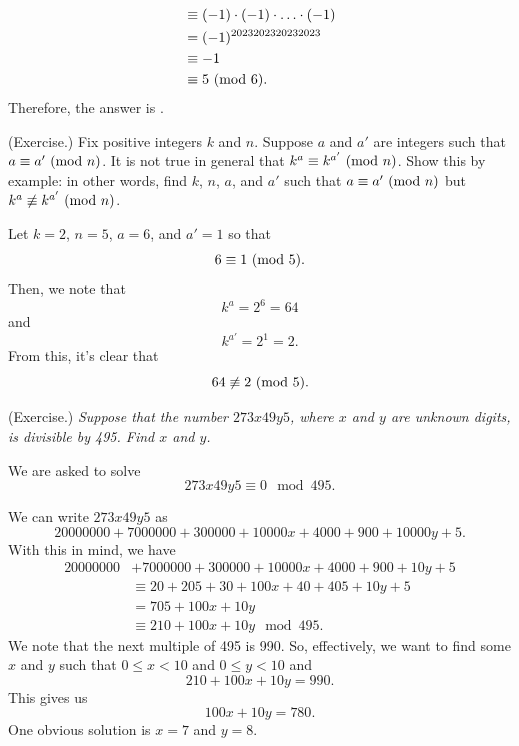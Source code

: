 \documentclass[letterpaper]{article}
\newcommand{\0}{\mathbf{0}}
\begin{document}
\begin{mdframed}
\begin{itemize}
\begin{mdframed}
\begin{equation*}
\begin{aligned}
                        &\equiv (-1) \cdot (-1) \cdot \hdots \cdot (-1) \\ 
                        &= (-1)^{2023202320232023} \\ 
                        &\equiv -1 \\ 
                        &\equiv 5 \ (\mathrm{mod}\ 6).
                \end{aligned}
            \end{equation*}
            Therefore, the answer is .
        \end{mdframed}
    \end{itemize}
\end{mdframed}

\begin{mdframed}
    (Exercise.) Fix positive integers $k$ and $n$. Suppose $a$ and $a'$ are integers such that $a \equiv a' \ (\mathrm{mod}\ n)$. It is not true in general that $k^a \equiv k^{a'} \ (\mathrm{mod}\ n)$. Show this by example: in other words, find $k$, $n$, $a$, and $a'$ such that $a \equiv a' \ (\mathrm{mod}\ n)$ but $k^a \not\equiv k^{a'} \ (\mathrm{mod}\ n)$. 

    \begin{mdframed}
        Let $k = 2$, $n = 5$, $a = 6$, and $a' = 1$ so that 
        \[6 \equiv 1 \ (\mathrm{mod}\ 5).\]
        Then, we note that 
        \[k^a = 2^6 = 64\]
        and 
        \[k^{a'} = 2^1 = 2.\]
        From this, it's clear that 
        \[64 \not\equiv 2 \ (\mathrm{mod}\ 5).\]
    \end{mdframed}
\end{mdframed}

\begin{mdframed}[nobreak=true]
    (Exercise.) \emph{Suppose that the number $273x49y5$, where $x$ and $y$ are unknown digits, is divisible by 495. Find $x$ and $y$.}
    \begin{mdframed}
        We are asked to solve 
        \[273x49y5 \equiv 0 \mod{495}.\]

        We can write $273x49y5$ as 
        \[20000000 + 7000000 + 300000 + 10000x + 4000 + 900 + 10000y + 5.\]
        With this in mind, we have
        \begin{equation*}
            \begin{aligned}
                20000000 &+ 7000000 + 300000 + 10000x + 4000 + 900 + 10y + 5 \\ 
                    &\equiv 20 + 205 + 30 + 100x + 40 + 405 + 10y + 5 \\ 
                    &= 705 + 100x + 10y \\ 
                    &\equiv 210 + 100x + 10y \mod{495}.
            \end{aligned}
        \end{equation*}
        We note that the next multiple of 495 is 990. So, effectively, we want to find some $x$ and $y$ such that $0 \leq x < 10$ and $0 \leq y < 10$ and
        \[210 + 100x + 10y = 990.\]
        This gives us 
        \[100x + 10y = 780.\]
        One obvious solution is $x = 7$ and $y = 8$. 
    \end{mdframed}
\end{mdframed}
\end{document}
